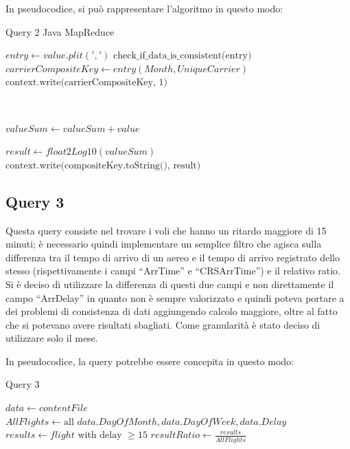 \documentclass[11pt]{article} %
\begin{document}
In pseudocodice, si può rappresentare l'algoritmo in questo modo:

\newpage

\begin{algorithm}
\caption{Query 2 Java MapReduce}\label{euclid}
\begin{algorithmic}[0]


\State $entry \gets value.plit(',')$
\State $\text{check\_if\_data\_is\_consistent(entry)}$
\State $carrierCompositeKey \gets entry(Month, UniqueCarrier)$
\State $\text{context.write(carrierCompositeKey, 1)}$

\EndProcedure

~


	\State $valueSum \gets valueSum + value$
\EndFor

\State $result \gets float2Log10(valueSum)$
\State $\text{context.write(compositeKey.toString(), result)}$

\EndProcedure


\end{algorithmic}
\end{algorithm}


\subsection{Query 3}

Questa query consiste nel trovare i voli che hanno un ritardo maggiore di 15 minuti; è necessario quindi implementare un semplice filtro che agisca sulla differenza tra il tempo di arrivo di un aereo e il tempo di arrivo registrato dello stesso (rispettivamente i campi ``ArrTime'' e ``CRSArrTime'') e il relativo ratio. Si è deciso di utilizzare la differenza di questi due campi e non direttamente il campo ``ArrDelay'' in quanto non è sempre valorizzato e quindi poteva portare a dei problemi di consistenza di dati aggiungendo calcolo maggiore, oltre al fatto che si potevano avere risultati sbagliati. Come granularità è stato deciso di utilizzare solo il mese.

In pseudocodice, la query potrebbe essere concepita in questo modo:

\begin{algorithm}
\caption{Query 3}\label{euclid}
\begin{algorithmic}[0]
\State $data \gets contentFile$
\State $AllFlights \gets \text{all } data.DayOfMonth, data.DayOfWeek, data.Delay$
\State $results \gets flight \text{ with delay } \geqslant 15$
\State $resultRatio \gets \frac{results}{AllFlights}$
\EndFor
\end{algorithmic}
\end{algorithm}
\end{document}
